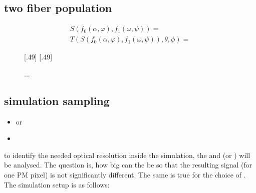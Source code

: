 \subsection{two fiber population}
\begin{align*}
    S(f_0(\alpha, \varphi), f_1(\omega, \psi)) = \\
    T(S(f_0(\alpha, \varphi), f_1(\omega, \psi)), \theta, \phi) = 
\end{align*}
% 
\begin{figure}[!t]
\centering
\def\tikzwidth{0.45*\textwidth}
[.49\textwidth]{
}
[.49\textwidth]{
}
\caption{...}
\end{figure}
% 
\subsection{simulation sampling}
% 
\begin{itemize}
    \item \micro or \macro
    \item \voxelsize
\end{itemize}

to identify the needed optical resolution inside the simulation, the \voxelsize and \model(\micro or \macro) will be analysed.
The question is, how big can the \voxelsize be so that the resulting signal (for one \ac{PM} pixel) is not significantly different.
The same is true for the choice of \model.
The simulation setup is as follows:

